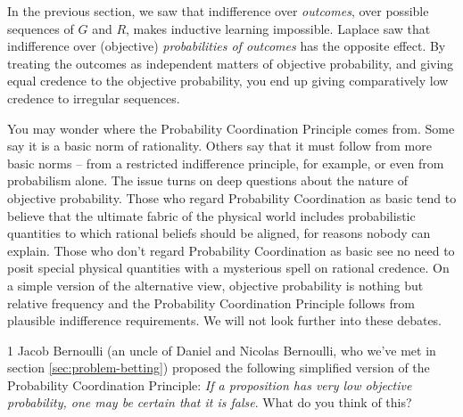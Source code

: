 In the previous section, we saw that indifference over \emph{outcomes}, over
possible sequences of $G$ and $R$, makes inductive learning impossible. Laplace
saw that indifference over (objective) \emph{probabilities of outcomes} has the
opposite effect. By treating the outcomes as independent matters of objective
probability, and giving equal credence to the objective probability, you end up
giving comparatively low credence to irregular sequences.


You may wonder where the Probability Coordination Principle comes from. Some say
it is a basic norm of rationality. Others say that it must follow from more
basic norms -- from a restricted indifference principle, for example, or even
from probabilism alone. The issue turns on deep questions about the nature of
objective probability. Those who regard Probability Coordination as basic tend
to believe that the ultimate fabric of the physical world includes probabilistic
quantities to which rational beliefs should be aligned, for reasons nobody can
explain. Those who don't regard Probability Coordination as basic see no need to
posit special physical quantities with a mysterious spell on rational credence.
On a simple version of the alternative view, objective probability is nothing
but relative frequency and the Probability Coordination Principle follows from
plausible indifference requirements. We will not look further into these
debates.





\begin{exercise}{1}
  Jacob Bernoulli (an uncle of Daniel and Nicolas Bernoulli, who we've met in
  section \ref{sec:problem-betting}) proposed the following simplified version
  of the Probability Coordination Principle: \emph{If a proposition has very low
    objective probability, one may be certain that it is false}. What do you
  think of this?
\end{exercise}

